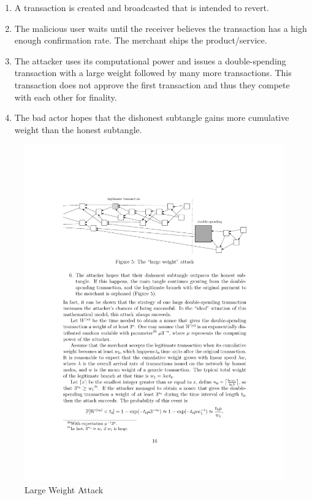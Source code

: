 \begin{enumerate}
    \item A transaction is created and broadcasted that is intended to revert.
    \item The malicious user waits until the receiver believes the transaction has a high enough confirmation rate. The merchant ships the product/service.
    \item The attacker uses its computational power and issues a double-spending transaction with a large weight followed by many more transactions. This transaction does not approve the first transaction and thus they compete with each other for finality.
    \item The bad actor hopes that the dishonest subtangle gains more cumulative weight than the honest subtangle.
\end{enumerate}

\begin{figure}[H]
    \centering
    \includegraphics[width=12cm]{images/large-weight-attack.pdf}
    \caption{Large Weight Attack \cite{the-tangle}}
    \label{fig:large-weight-attack}
\end{figure}

